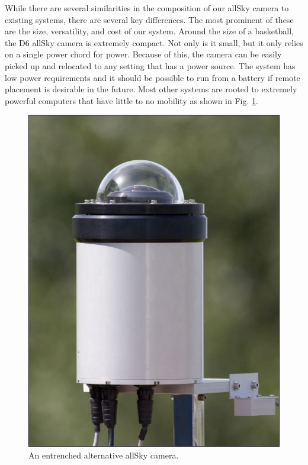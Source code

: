 While there are several similarities in the composition of our allSky camera to existing systems, there are several key differences.
The most prominent of these are the size, versatility, and cost of our system.
Around the size of a basketball, the D6 allSky camera is extremely compact.  
Not only is it small, but it only relies on a single power chord for power.  
Because of this, the camera can be easily picked up and relocated to any setting that has a power source.  
The system has low power requirements and it should be possible to run from a battery if remote placement is desirable in the future.
Most other systems are rooted to extremely powerful computers that have little to no mobility as shown in Fig. \ref{immobile}.

\begin{figure}[ht!]
  \centering
  \includegraphics[scale=0.3]{images/othercam.jpg}
  \caption{An entrenched alternative allSky camera.}
  \label{immobile}
\end{figure}

